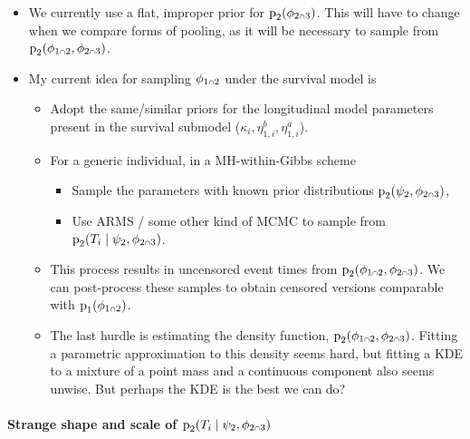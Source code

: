\documentclass[
  10pt,
  a4paper,
]{article}
\providecommand{\tightlist}{%
  \setlength{\itemsep}{0pt}\setlength{\parskip}{0pt}}
\let\Oldcap\cap
\renewcommand{\cap}{\mathrel{\mathsmaller{\Oldcap}}}
\newcommand{\pd}{\text{p}}
\begin{document}
\begin{itemize}
\tightlist
\item
  We currently use a flat, improper prior for
  \(\pd_{2}(\phi_{2 \cap 3})\). This will have to change when we compare
  forms of pooling, as it will be necessary to sample from
  \(\pd_{2}(\phi_{1 \cap 2}, \phi_{2 \cap 3})\).
\item
  My current idea for sampling \(\phi_{1 \cap 2}\) under the survival
  model is

  \begin{itemize}
  \tightlist
  \item
    Adopt the same/similar priors for the longitudinal model parameters
    present in the survival submodel
    (\(\kappa_{i}, \eta_{1, i}^{b}, \eta_{1, i}^{a}\)).
  \item
    For a generic individual, in a MH-within-Gibbs scheme

    \begin{itemize}
    \tightlist
    \item
      Sample the parameters with known prior distributions
      \(\pd_{2}(\psi_{2}, \phi_{2 \cap 3})\),
    \item
      Use ARMS / some other kind of MCMC to sample from
      \(\pd_{2}(T_{i} \mid \psi_{2}, \phi_{2 \cap 3})\).
    \end{itemize}
  \item
    This process results in uncensored event times from
    \(\pd_{2}(\phi_{1 \cap 2}, \phi_{2 \cap 3})\). We can post-process
    these samples to obtain censored versions comparable with
    \(\pd_{1}(\phi_{1 \cap 2})\).
  \item
    The last hurdle is estimating the density function,
    \(\pd_{2}(\phi_{1 \cap 2}, \phi_{2 \cap 3})\). Fitting a parametric
    approximation to this density seems hard, but fitting a KDE to a
    mixture of a point mass and a continuous component also seems
    unwise. But perhaps the KDE is the best we can do?
  \end{itemize}
\end{itemize}

\hypertarget{strange-shape-and-scale-of-pd_2t_i-mid-psi_2-phi_2-cap-3}{%
\paragraph{\texorpdfstring{Strange shape and scale of
\(\pd_{2}(T_{i} \mid \psi_{2}, \phi_{2 \cap 3})\)}{Strange shape and scale of \textbackslash pd\_\{2\}(T\_\{i\} \textbackslash mid \textbackslash psi\_\{2\}, \textbackslash phi\_\{2 \textbackslash cap 3\})}}\label{strange-shape-and-scale-of-pd_2t_i-mid-psi_2-phi_2-cap-3}}
\end{document}
